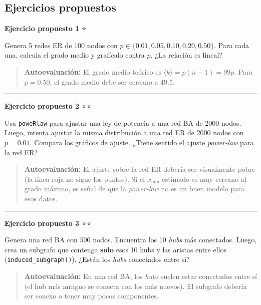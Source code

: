 \documentclass[
  letterpaper,
  DIV=11,
  numbers=noendperiod]{scrreprt}
\begin{document}
\subsection*{Ejercicios propuestos}\label{ejercicios-propuestos-1}

\textbf{Ejercicio propuesto 1} ⭐

Genera 5 redes ER de 100 nodos con
\(p \in \{0.01, 0.05, 0.10, 0.20, 0.50\}\). Para cada una, calcula el
grado medio y grafícalo contra \(p\). ¿La relación es lineal?

\begin{quote}
\textbf{Autoevaluación:} El grado medio teórico es
\(\langle k \rangle = p(n-1) = 99p\). Para \(p = 0.50\), el grado medio
debe ser cercano a 49.5.
\end{quote}

\begin{center}\rule{0.5\linewidth}{0.5pt}\end{center}

\textbf{Ejercicio propuesto 2} ⭐⭐

Usa \texttt{poweRlaw} para ajustar una ley de potencia a una red BA de
2000 nodos. Luego, intenta ajustar la misma distribución a una red ER de
2000 nodos con \(p = 0.01\). Compara los gráficos de ajuste. ¿Tiene
sentido el ajuste \emph{power-law} para la red ER?

\begin{quote}
\textbf{Autoevaluación:} El ajuste sobre la red ER debería ser
visualmente pobre (la línea roja no sigue los puntos). Si el
\(x_{\min}\) estimado es muy cercano al grado máximo, es señal de que la
\emph{power-law} no es un buen modelo para esos datos.
\end{quote}

\begin{center}\rule{0.5\linewidth}{0.5pt}\end{center}

\textbf{Ejercicio propuesto 3} ⭐⭐

Genera una red BA con 500 nodos. Encuentra los 10 \emph{hubs} más
conectados. Luego, crea un subgrafo que contenga \textbf{solo} esos 10
hubs y las aristas entre ellos (\texttt{induced\_subgraph()}). ¿Están
los \emph{hubs} conectados entre sí?

\begin{quote}
\textbf{Autoevaluación:} En una red BA, los \emph{hubs} suelen estar
conectados entre sí (el hub más antiguo se conecta con los más nuevos).
El subgrafo debería ser conexo o tener muy pocos componentes.
\end{quote}
\end{document}
